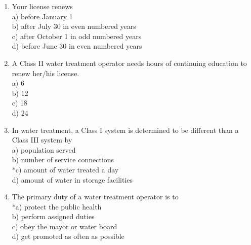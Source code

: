 \begin{enumerate}
    \item Your license renews\\
a) before January 1\\
b) after July 30 in even numbered years\\
c) after October 1 in odd numbered years\\
d) before June 30 in even numbered years\\
  \item A Class II water treatment operator needs hours of continuing education to renew her/his license.\\
a) 6\\
b) 12\\
c) 18\\
d) 24\\
  \item In water treatment, a Class I system is determined to be different than a Class III system by\\
a) population served\\
b) number of service connections\\
*c) amount of water treated a day\\
d) amount of water in storage facilities\\
  \item The primary duty of a water treatment operator is to\\
*a) protect the public health\\
b) perform assigned duties\\
c) obey the mayor or water board\\
d) get promoted as often as possible\\
\end{enumerate}


